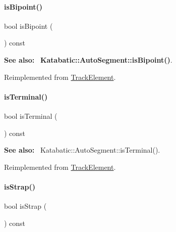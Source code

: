 \paragraph{\texorpdfstring{is\+Bipoint()}{isBipoint()}}
{\footnotesize\ttfamily bool is\+Bipoint (\begin{DoxyParamCaption}{ }\end{DoxyParamCaption}) const\hspace{0.3cm}{\ttfamily [virtual]}}

{\bfseries See also\+:}~ \textbf{ Katabatic\+::\+Auto\+Segment\+::is\+Bipoint()}. 

Reimplemented from \hyperlink{classKite_1_1TrackElement_a72741158d19af38e84c5e9c08f91270f}{Track\+Element}.

\mbox{\label{classKite_1_1TrackSegment_a1e074cb3064037035548e5e6d238e315}} 
\paragraph{\texorpdfstring{is\+Terminal()}{isTerminal()}}
{\footnotesize\ttfamily bool is\+Terminal (\begin{DoxyParamCaption}{ }\end{DoxyParamCaption}) const\hspace{0.3cm}{\ttfamily [virtual]}}

{\bfseries See also\+:}~ Katabatic\+::\+Auto\+Segment\+::is\+Terminal(). 

Reimplemented from \hyperlink{classKite_1_1TrackElement_a1e074cb3064037035548e5e6d238e315}{Track\+Element}.

\mbox{\label{classKite_1_1TrackSegment_a62d61c231cf404a814ae37665fa8164f}} 
\paragraph{\texorpdfstring{is\+Strap()}{isStrap()}}
{\footnotesize\ttfamily bool is\+Strap (\begin{DoxyParamCaption}{ }\end{DoxyParamCaption}) const\hspace{0.3cm}{\ttfamily [virtual]}}

